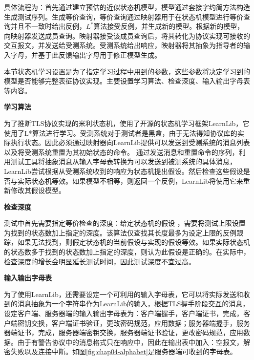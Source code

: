 具体流程为：首先通过建立预估的近似状态机模型，模型通过套接字约简方法构造生成测试序列。生成等价查询，等价查询通过映射器用于在状态机模型进行等价查询并且不一致时给出反例，$L^{*}$算法接受反例，并生成新的模型。根据新的模型，向映射器发送成员查询。映射器接受该成员查询后，将其转化为协议实现可接收的交互报文，并发送给受测系统。受测系统给出响应，映射器将其抽象为指导者的输入字母，并基于此反馈输出字母用于修正模型生成。


本节状态机学习设置是为了指定学习过程中用到的参数，这些参数将决定学习到的模型是否能够完整表征协议实现。主要设置学习算法、检查深度、输入输出字母表等内容。

\textbf{学习算法}

为了推断TLS协议实现的米利状态机，使用了开源的状态机学习框架LearnLib\cite{Raffelt2009}，它使用了L*算法进行学习。受测系统对于测试者是黑盒，由于无法得知协议库的实际执行状态。因此必须通过映射器向LearnLib提供可以发送到受测系统的消息列表以及将受测系统重置为其初始状态的命令。
通过发送消息和重置命令的序列，利用测试工具将抽象消息从输入字母表转换为可以发送到被测系统的具体消息，LearnLib尝试根据从受测系统收到的响应为状态机提出假设。然后检查这些假设是否与实际状态机等效。如果模型不相等，则返回一个反例，LearnLib将使用它来重新修改其假设模型。

\textbf{检查深度}

测试中首先需要指定等价检查的深度：给定状态机的假设 ，需要将测试上限设置为找到的状态数加上指定的深度。该算法仅查找其长度最多为设定上限的反例跟踪，如果无法找到，则假定状态机的当前假设与实现的假设等效。如果实际状态机的状态数多于找到的状态数加上指定的深度，则认为此假设是正确的。在实际中，检查深度的增长会明显延长测试时间，因此测试深度不宜过高。

\textbf{输入输出字母表}

为了使用LearnLib，还需要设定一个可利用的输入字母表，它可以将实际发送和收到的消息抽象为一个字符串作为LearnLib的输入，根据TLS握手阶段交互的消息，设定客户端、服务器端的输入输出字母表为：客户端握手，客户端证书，完成，客户端密钥交换，客户端证书验证，更改密码规范，应用数据；服务器端握手，服务器端证书，完成，服务器端密钥交换，服务器端证书验证，更改密码规范，应用数据。由于有警告协议中的消息格式只在响应中，因此在输出表中加入：空报文，解密失败以及连接中断。如图\ref{fig:chap04-alphabet}是服务器端可收到的字母表。

